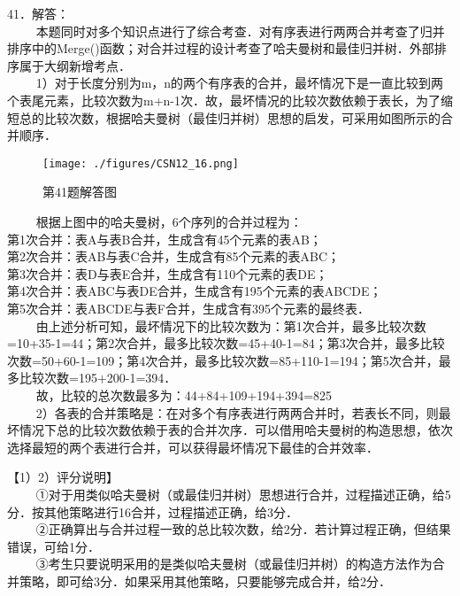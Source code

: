 41．解答：\\
$\qquad$ 本题同时对多个知识点进行了综合考查．对有序表进行两两合并考查了归并排序中的Merge()函数；对合并过程的设计考查了哈夫曼树和最佳归并树．外部排序属于大纲新增考点．\\
$\qquad$ 1）对于长度分别为m，n的两个有序表的合并，最坏情况下是一直比较到两个表尾元素，比较次数为m+n-1次．故，最坏情况的比较次数依赖于表长，为了缩短总的比较次数，根据哈夫曼树（最佳归并树）思想的启发，可采用如图所示的合并顺序．
\begin{figure}[ht]
\centering
\texttt{[image: ./figures/CSN12\_16.png]}
\caption{第41题解答图} \label{CSN12_fig16}
\end{figure}
$\qquad$ 根据上图中的哈夫曼树，6个序列的合并过程为：\\
第1次合并：表A与表B合并，生成含有45个元素的表AB；\\
第2次合并：表AB与表C合并，生成含有85个元素的表ABC；\\
第3次合并：表D与表E合并，生成含有110个元素的表DE；\\
第4次合并：表ABC与表DE合并，生成含有195个元素的表ABCDE；\\
第5次合并：表ABCDE与表F合并，生成含有395个元素的最终表．\\
$\qquad$ 由上述分析可知，最坏情况下的比较次数为：第1次合并，最多比较次数=10+35-1=44；第2次合并，最多比较次数=45+40-1=84；第3次合并，最多比较次数=50+60-1=109；第4次合并，最多比较次数=85+110-1=194；第5次合并，最多比较次数=195+200-1=394．\\
$\qquad$ 故，比较的总次数最多为：44+84+109+194+394=825 \\
$\qquad$ 2）各表的合并策略是：在对多个有序表进行两两合并时，若表长不同，则最坏情况下总的比较次数依赖于表的合并次序．可以借用哈夫曼树的构造思想，依次选择最短的两个表进行合并，可以获得最坏情况下最佳的合并效率．

【1）2）评分说明】\\
$\qquad$ ①对于用类似哈夫曼树（或最佳归并树）思想进行合并，过程描述正确，给5分．按其他策略进行16合并，过程描述正确，给3分．\\
$\qquad$ ②正确算出与合并过程一致的总比较次数，给2分．若计算过程正确，但结果错误，可给1分．\\
$\qquad$ ③考生只要说明采用的是类似哈夫曼树（或最佳归并树）的构造方法作为合并策略，即可给3分．如果采用其他策略，只要能够完成合并，给2分．